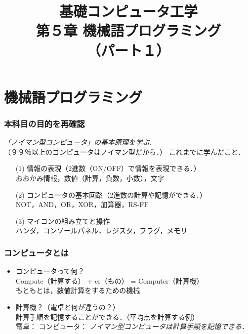 \documentclass{beamer}                 %
\begin{document}
\title{基礎コンピュータ工学\\第５章 機械語プログラミング\\（パート１）}
\date{}

\begin{frame}
  \titlepage
\end{frame}


\section{機械語プログラミング}
\begin{frame}
  \frametitle{本科目の目的を再確認}
  \emph{「ノイマン型コンピュータ」の基本原理を学ぶ．}\\
  （９９％以上のコンピュータはノイマン型だから．）
  \vfill
  これまでに学んだこと．
  \begin{enumerate}
    \item[(1)] 情報の表現（2進数（ON/OFF）で情報を表現できる．）\\
      おおかみ情報，数値（計算，負数，小数），文字
      \vfill
    \item[(2)] コンピュータの基本回路（2進数の計算や記憶ができる．）\\
      NOT，AND，OR，XOR，加算器，RS-FF
      \vfill
    \item[(3)] マイコンの組み立てと操作\\
      ハンダ，コンソールパネル，レジスタ，フラグ，メモリ
  \end{enumerate}
  \vfill
\end{frame}

\begin{frame}
  \frametitle{コンピュータとは}
  \begin{itemize}
  \item コンピュータって何？\\
    Compute（計算する） + er（もの） = Computer（計算機）\\
    もともとは，数値計算をするための機械
    \vfill
  \item 計算機？（電卓と何が違うの？） \\
    計算手順を記憶することができる．（平均点を計算する例）\\
    \vfill
    電卓：
    \vfill
    コンピュータ：
    \vfill
    \emph{ノイマン型コンピュータは計算手順を記憶できる．}
  \end{itemize}
\end{frame}
\end{document}
